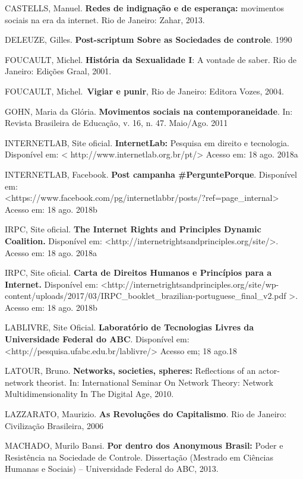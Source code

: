 CASTELLS, Manuel. \textbf{Redes de indignação e de esperança:}
movimentos sociais na era da internet. Rio de Janeiro: Zahar, 2013.

DELEUZE, Gilles. \textbf{Post-scriptum Sobre as Sociedades de controle}.
1990

FOUCAULT, Michel. \textbf{História da Sexualidade I}: A vontade de
saber. Rio de Janeiro: Edições Graal, 2001.

FOUCAULT, Michel.~\textbf{Vigiar e punir}, Rio de Janeiro: Editora
Vozes, 2004.

GOHN, Maria da Glória. \textbf{Movimentos sociais na contemporaneidade}.
In: Revista Brasileira de Educação, v. 16, n. 47. Maio/Ago. 2011

INTERNETLAB, Site oficial. \textbf{InternetLab:} Pesquisa em direito e
tecnologia. Disponível em: \textless{}
http://www.internetlab.org.br/pt/\textgreater{} Acesso em: 18 ago. 2018a

INTERNETLAB, Facebook. \textbf{Post campanha \#PerguntePorque}.
Disponível em:\\
\textless{}https://www.facebook.com/pg/internetlabbr/posts/?ref=page\_internal\textgreater{}
Acesso em: 18 ago. 2018b

IRPC, Site oficial. \textbf{The Internet Rights and Principles Dynamic
Coalition.} Disponível em:
\textless{}http://internetrightsandprinciples.org/site/\textgreater{}.
Acesso em: 18 ago. 2018a

IRPC, Site oficial. \textbf{Carta de Direitos Humanos e Princípios para
a Internet.} Disponível em:
\textless{}http://internetrightsandprinciples.org/site/wp-content/uploads/2017/03/IRPC\_booklet\_brazilian-portuguese\_final\_v2.pdf
\textgreater{}. Acesso em: 18 ago. 2018b

LABLIVRE, Site Oficial. \textbf{Laboratório de Tecnologias Livres da
Universidade Federal do ABC}. Disponível em:
\textless{}http://pesquisa.ufabc.edu.br/lablivre/\textgreater{} Acesso
em; 18 ago.18

LATOUR, Bruno. \textbf{Networks, societies, spheres:} Reflections of an
actor-network theorist. In: International Seminar On Network Theory:
Network Multidimensionality In The Digital Age, 2010.

LAZZARATO, Maurizio. \textbf{As Revoluções do Capitalismo}. Rio de
Janeiro: Civilização Brasileira, 2006

MACHADO, Murilo Bansi. \textbf{Por dentro dos Anonymous Brasil:} Poder e
Resistência na Sociedade de Controle. Dissertação (Mestrado em Ciências
Humanas e Sociais) -- Universidade Federal do ABC, 2013.

